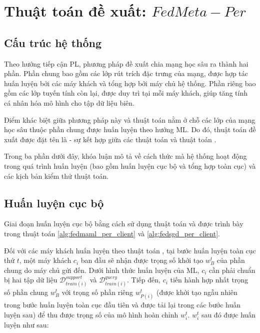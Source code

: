 \section{Thuật toán đề xuất: $FedMeta-Per$}

\subsection{Cấu trúc hệ thống}

Theo hướng tiếp cận PL, phương pháp đề xuất chia mạng học sâu ra thành hai phần. Phần chung bao gồm các lớp rút trích đặc trưng của mạng, được hợp tác huấn luyện bởi các máy khách và tổng hợp bởi máy chủ hệ thống. Phần riêng bao gồm các lớp tuyến tính còn lại, được duy trì tại mỗi máy khách, giúp tăng tính cá nhân hóa mô hình cho tập dữ liệu biên.

Điểm khác biệt giữa phương pháp này và thuật toán  nằm ở chỗ các lớp của mạng học sâu thuộc phần chung được huấn luyện theo hướng ML. Do đó, thuật toán đề xuất được đặt tên là  - sự kết hợp giữa các thuật toán  và thuật toán .

Trong ba phần dưới đây, khóa luận mô tả về cách thức mà hệ thống hoạt động trong quá trình huấn luyện (bao gồm huấn luyện cục bộ và tổng hợp toàn cục) và các kịch bản kiểm thử thuật toán.

\subsection{Huấn luyện cục bộ}

Giai đoạn huấn luyện cục bộ bằng cách sử dụng thuật toán  và  được trình bày trong thuật toán \ref{alg:fedmaml_per_client} và \ref{alg:fedsgd_per_client}. 

Đối với các máy khách huấn luyện theo thuật toán , tại bước huấn luyện toàn cục thứ $t$, một máy khách $c_i$ ban đầu sẽ nhận được trọng số khởi tạo $w_B^t$ của phần chung do máy chủ gửi đến. Dưới hình thức huấn luyện của ML, $c_i$ cần phải chuẩn bị hai tập dữ liệu $\mathcal{D}_{train(i)}^{support}$ và $\mathcal{D}_{train(i)}^{query}$. Tiếp đến, $c_i$ tiến hành hợp nhất trọng số phần chung $w_B^t$ với trọng số phần riêng $w_{P(i)}^t$ (được khởi tạo ngẫu nhiên trong bước huấn luyện toàn cục đầu tiên và được tải lại trong các bước huấn luyện sau) để thu được trọng số của mô hình hoàn chỉnh $w_i^t$. $w_i^t$ sau đó được huấn luyện như sau:

